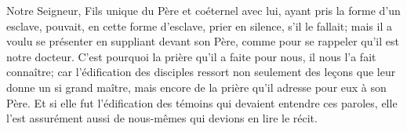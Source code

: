 Notre Seigneur, Fils unique du Père et coéternel avec lui,
	ayant pris la forme d’un esclave,
	pouvait, en cette forme d’esclave, prier en silence, s’il le fallait;
	mais il a voulu se présenter en suppliant devant son Père,
	comme pour se rappeler qu’il est notre docteur.
C’est pourquoi la prière qu’il a faite pour nous, il nous l’a fait connaître;
	car l’édification des disciples ressort
		non seulement des leçons que leur donne un si grand maître,
	mais encore de la prière qu’il adresse pour eux à son Père.
Et si elle fut l’édification des témoins qui devaient entendre ces paroles,
	elle l’est assurément aussi de nous-mêmes qui devions en lire le récit.
